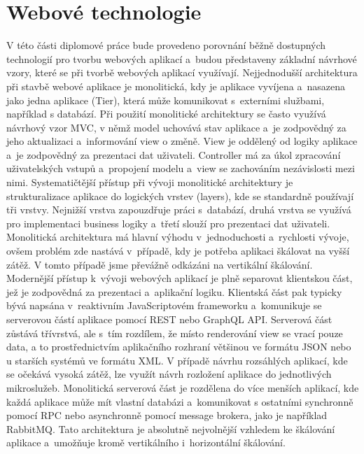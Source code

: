 \chapter{Webové technologie}
V této části diplomové práce bude provedeno porovnání běžně dostupných technologií pro tvorbu webových aplikací a~budou představeny základní návrhové vzory, které se při tvorbě webových aplikací využívají. 
\newpara
Nejjednodušší architektura \cite{architekturyEbook} při stavbě webové aplikace je monolitická, kdy je aplikace vyvíjena a~nasazena jako jedna aplikace (Tier), která může komunikovat s~externími službami, například s databází. Při použití monolitické architektury se často využívá návrhový vzor MVC, v němž model uchovává stav aplikace a~je zodpovědný za jeho aktualizaci a~informování view o změně. View je oddělený od logiky aplikace a~je zodpovědný za prezentaci dat uživateli. Controller má za úkol zpracování uživatelských vstupů a~propojení modelu a~view se zachováním nezávislosti mezi nimi. 
\newpara
Systematičtější přístup při vývoji monolitické architektury je strukturalizace aplikace do logických vrstev (layers), kde se standardně používají tři vrstvy. Nejnižší vrstva zapouzdřuje práci s~databází, druhá vrstva se využívá pro implementaci business logiky a~třetí slouží pro prezentaci dat uživateli. 
\newpara
Monolitická architektura má hlavní výhodu v~jednoduchosti a~rychlosti vývoje, ovšem problém zde nastává v~případě, kdy je potřeba aplikaci škálovat na vyšší zátěž. V tomto případě jsme převážně odkázáni na vertikální škálování. 
\newpara
Modernější přístup k~vývoji webových aplikací je plně separovat klientskou část, jež je zodpovědná za prezentaci a~aplikační logiku. Klientská část pak typicky bývá napsána v~reaktivním JavaScriptovém frameworku a~komunikuje se serverovou částí aplikace pomocí REST nebo GraphQL API. Serverová část zůstává třívrstvá, ale s~tím rozdílem, že místo renderování view se vrací pouze data, a to prostřednictvím aplikačního rozhraní většinou ve formátu JSON nebo u starších systémů ve formátu XML.
\newpara
V případě návrhu rozsáhlých aplikací, kde se očekává vysoká zátěž, lze využít návrh rozložení aplikace do jednotlivých mikroslužeb. Monolitická serverová část je rozdělena do více menších aplikací, kde každá aplikace může mít vlastní databázi a~komunikovat s ostatními synchronně pomocí RPC nebo asynchronně pomocí message brokera, jako je například RabbitMQ. Tato architektura je absolutně nejvolnější vzhledem ke škálování aplikace a~umožňuje kromě vertikálního i~horizontální škálování.

